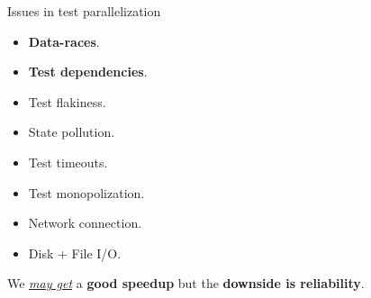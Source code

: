 \documentclass{beamer}
\begin{document}
\begin{frame}{Issues in test parallelization}
\begin{itemize}
	\item{{\color{red}\textbf{Data-races}}.}
	\item{{\color{red}\textbf{Test dependencies}}.}
	\item{Test flakiness.}
	\item{State pollution.}\pause
	\item{Test timeouts.}
	\item{Test monopolization}.\pause
	\item{Network connection.}
	\item{Disk + File I/O.}\pause
\end{itemize}
\vfill
{We \underline{\textit{may get}} a {\color{indiagreen}\textbf{good speedup}} but the {\color{red}\textbf{downside is reliability}}.}
\end{frame}
\end{document}
